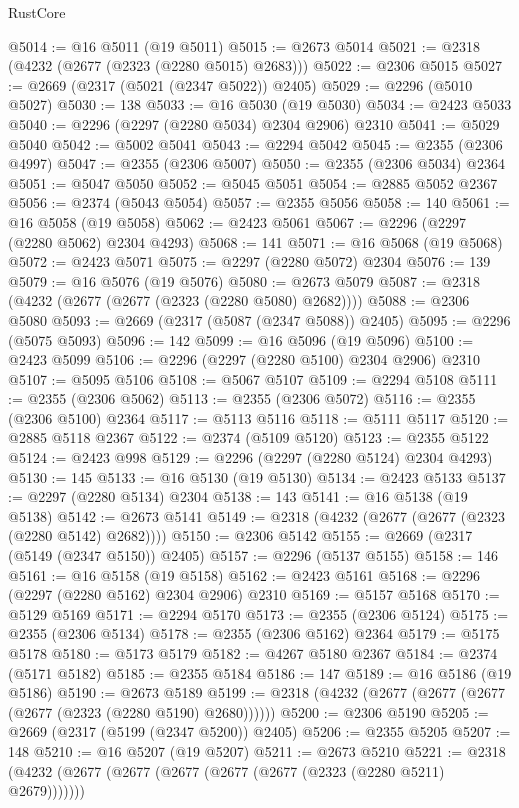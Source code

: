 \begin{lexlean}{RustCore}
\begin{coremodule}
@5014 := @16 @5011 (@19 @5011)
@5015 := @2673 @5014
@5021 := @2318 (@4232 (@2677 (@2323 (@2280 @5015) @2683)))
@5022 := @2306 @5015
@5027 := @2669 (@2317 (@5021 (@2347 @5022)) @2405)
@5029 := @2296 (@5010 @5027)
@5030 := 138
@5033 := @16 @5030 (@19 @5030)
@5034 := @2423 @5033
@5040 := @2296 (@2297 (@2280 @5034) @2304 @2906) @2310
@5041 := @5029 @5040
@5042 := @5002 @5041
@5043 := @2294 @5042
@5045 := @2355 (@2306 @4997)
@5047 := @2355 (@2306 @5007)
@5050 := @2355 (@2306 @5034) @2364
@5051 := @5047 @5050
@5052 := @5045 @5051
@5054 := @2885 @5052 @2367
@5056 := @2374 (@5043 @5054)
@5057 := @2355 @5056
@5058 := 140
@5061 := @16 @5058 (@19 @5058)
@5062 := @2423 @5061
@5067 := @2296 (@2297 (@2280 @5062) @2304 @4293)
@5068 := 141
@5071 := @16 @5068 (@19 @5068)
@5072 := @2423 @5071
@5075 := @2297 (@2280 @5072) @2304
@5076 := 139
@5079 := @16 @5076 (@19 @5076)
@5080 := @2673 @5079
@5087 := @2318 (@4232 (@2677 (@2677 (@2323 (@2280 @5080) @2682))))
@5088 := @2306 @5080
@5093 := @2669 (@2317 (@5087 (@2347 @5088)) @2405)
@5095 := @2296 (@5075 @5093)
@5096 := 142
@5099 := @16 @5096 (@19 @5096)
@5100 := @2423 @5099
@5106 := @2296 (@2297 (@2280 @5100) @2304 @2906) @2310
@5107 := @5095 @5106
@5108 := @5067 @5107
@5109 := @2294 @5108
@5111 := @2355 (@2306 @5062)
@5113 := @2355 (@2306 @5072)
@5116 := @2355 (@2306 @5100) @2364
@5117 := @5113 @5116
@5118 := @5111 @5117
@5120 := @2885 @5118 @2367
@5122 := @2374 (@5109 @5120)
@5123 := @2355 @5122
@5124 := @2423 @998
@5129 := @2296 (@2297 (@2280 @5124) @2304 @4293)
@5130 := 145
@5133 := @16 @5130 (@19 @5130)
@5134 := @2423 @5133
@5137 := @2297 (@2280 @5134) @2304
@5138 := 143
@5141 := @16 @5138 (@19 @5138)
@5142 := @2673 @5141
@5149 := @2318 (@4232 (@2677 (@2677 (@2323 (@2280 @5142) @2682))))
@5150 := @2306 @5142
@5155 := @2669 (@2317 (@5149 (@2347 @5150)) @2405)
@5157 := @2296 (@5137 @5155)
@5158 := 146
@5161 := @16 @5158 (@19 @5158)
@5162 := @2423 @5161
@5168 := @2296 (@2297 (@2280 @5162) @2304 @2906) @2310
@5169 := @5157 @5168
@5170 := @5129 @5169
@5171 := @2294 @5170
@5173 := @2355 (@2306 @5124)
@5175 := @2355 (@2306 @5134)
@5178 := @2355 (@2306 @5162) @2364
@5179 := @5175 @5178
@5180 := @5173 @5179
@5182 := @4267 @5180 @2367
@5184 := @2374 (@5171 @5182)
@5185 := @2355 @5184
@5186 := 147
@5189 := @16 @5186 (@19 @5186)
@5190 := @2673 @5189
@5199 := @2318 (@4232 (@2677 (@2677 (@2677 (@2677 (@2323 (@2280 @5190) @2680))))))
@5200 := @2306 @5190
@5205 := @2669 (@2317 (@5199 (@2347 @5200)) @2405)
@5206 := @2355 @5205
@5207 := 148
@5210 := @16 @5207 (@19 @5207)
@5211 := @2673 @5210
@5221 := @2318 (@4232 (@2677 (@2677 (@2677 (@2677 (@2677 (@2323 (@2280 @5211) @2679)))))))

\end{coremodule}
\end{lexlean}
